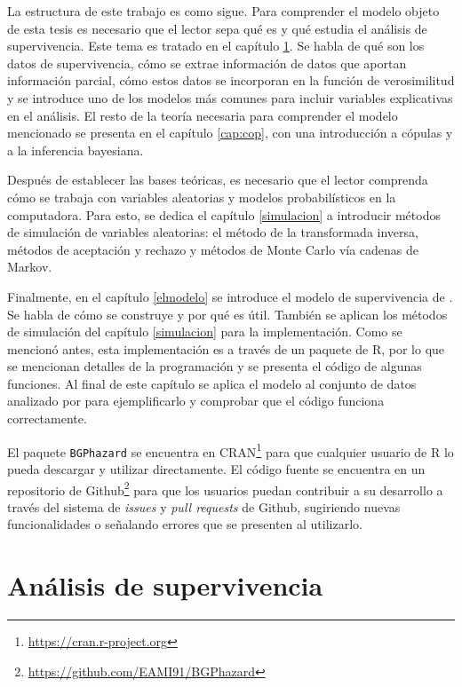 \documentclass[11pt,a4paper]{article}
\begin{document}
La estructura de este trabajo es como sigue. Para comprender el modelo objeto de esta tesis \citep{nieto} es necesario que el lector sepa qué es y qué estudia el análisis de supervivencia. Este tema es tratado en el capítulo \ref{analisis_sup}. Se habla de qué son los datos de supervivencia, cómo se extrae información de datos que aportan información parcial, cómo estos datos se incorporan en la función de verosimilitud y se introduce uno de los modelos más comunes para incluir variables explicativas en el análisis. El resto de la teoría necesaria para comprender el modelo mencionado se presenta en el capítulo \ref{cap:cop}, con una introducción a cópulas y a la inferencia bayesiana.

Después de establecer las bases teóricas, es necesario que el lector comprenda cómo se trabaja con variables aleatorias y modelos probabilísticos en la computadora. Para esto, se dedica el capítulo \ref{simulacion} a introducir métodos de simulación de variables aleatorias: el método de la transformada inversa, métodos de aceptación y rechazo y métodos de Monte Carlo vía cadenas de Markov.

Finalmente, en el capítulo \ref{elmodelo} se introduce el modelo de supervivencia de \citet{nieto}. Se habla de cómo se construye y por qué es útil. También se aplican los métodos de simulación del capítulo \ref{simulacion} para la implementación. Como se mencionó antes, esta implementación es a través de un paquete de R, por lo que se mencionan detalles de la programación y se presenta el código de algunas funciones. Al final de este capítulo se aplica el modelo al conjunto de datos analizado por \citet{nieto} para ejemplificarlo y comprobar que el código funciona correctamente.

El paquete \texttt{BGPhazard} \citep{bgphazard} se encuentra en CRAN\footnote{\url{https://cran.r-project.org}} para que cualquier usuario de R lo pueda descargar y utilizar directamente.  El código fuente se encuentra en un repositorio de Github\footnote{\url{https://github.com/EAMI91/BGPhazard}} para que los usuarios puedan contribuir a su desarrollo a través del sistema de \textit{issues} y \textit{pull requests} de Github, sugiriendo nuevas funcionalidades o señalando errores que se presenten al utilizarlo.

\newpage

\section{Análisis de supervivencia} \label{analisis_sup}
\end{document}
